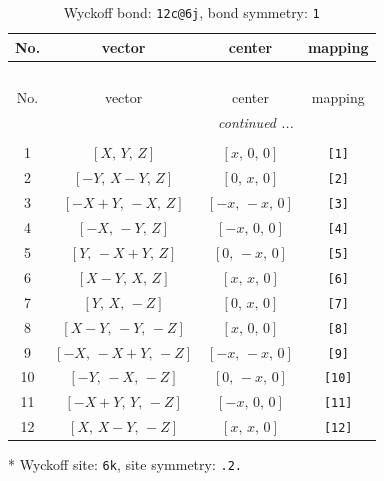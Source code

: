 \documentclass[fleqn,8pt]{jsarticle}
\begin{document}
\begin{longtable}{cccc}
\caption{Wyckoff bond: {\tt 12c@6j}, bond symmetry: {\tt 1}}
 \\
 \hline \hline
No. & vector & center & mapping \\ \hline \endfirsthead

\multicolumn{3}{l}{\tablename\ \thetable{}} \\
 \hline \hline
No. & vector & center & mapping \\ \hline \endhead

 \hline \hline
\multicolumn{3}{r}{\footnotesize\it continued ...} \\ \endfoot

 \hline \hline
\multicolumn{3}{r}{} \\ \endlastfoot

1 & $\left[ X,\, Y,\, Z \right]$ & $\left[ x,\, 0,\, 0 \right]$ & {\tt [1]} \\ \hline
2 & $\left[ - Y,\, X - Y,\, Z \right]$ & $\left[ 0,\, x,\, 0 \right]$ & {\tt [2]} \\ \hline
3 & $\left[ - X + Y,\, - X,\, Z \right]$ & $\left[ - x,\, - x,\, 0 \right]$ & {\tt [3]} \\ \hline
4 & $\left[ - X,\, - Y,\, Z \right]$ & $\left[ - x,\, 0,\, 0 \right]$ & {\tt [4]} \\ \hline
5 & $\left[ Y,\, - X + Y,\, Z \right]$ & $\left[ 0,\, - x,\, 0 \right]$ & {\tt [5]} \\ \hline
6 & $\left[ X - Y,\, X,\, Z \right]$ & $\left[ x,\, x,\, 0 \right]$ & {\tt [6]} \\ \hline
7 & $\left[ Y,\, X,\, - Z \right]$ & $\left[ 0,\, x,\, 0 \right]$ & {\tt [7]} \\ \hline
8 & $\left[ X - Y,\, - Y,\, - Z \right]$ & $\left[ x,\, 0,\, 0 \right]$ & {\tt [8]} \\ \hline
9 & $\left[ - X,\, - X + Y,\, - Z \right]$ & $\left[ - x,\, - x,\, 0 \right]$ & {\tt [9]} \\ \hline
10 & $\left[ - Y,\, - X,\, - Z \right]$ & $\left[ 0,\, - x,\, 0 \right]$ & {\tt [10]} \\ \hline
11 & $\left[ - X + Y,\, Y,\, - Z \right]$ & $\left[ - x,\, 0,\, 0 \right]$ & {\tt [11]} \\ \hline
12 & $\left[ X,\, X - Y,\, - Z \right]$ & $\left[ x,\, x,\, 0 \right]$ & {\tt [12]} \\
\end{longtable}
* Wyckoff site: {\tt 6k}, site symmetry: {\tt .2.}
\renewcommand{\arraystretch}{1.2}
\end{document}
